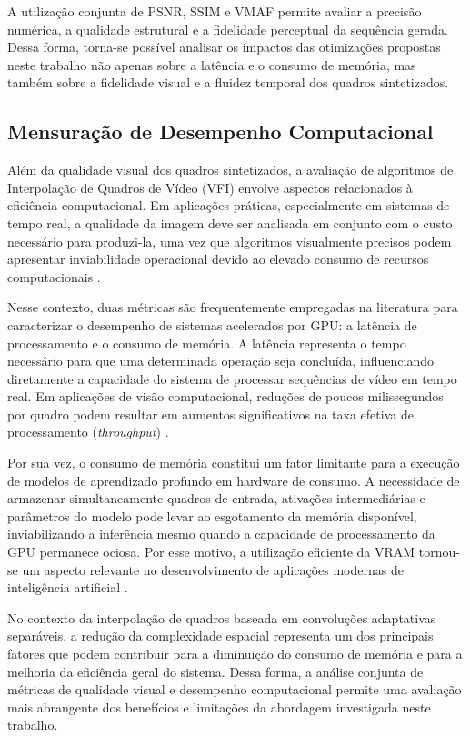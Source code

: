 \documentclass[
    12pt,                %
    openright,           %
    oneside,             %
    a4paper,             %
    english,             %
    brazil               %
]{abntex2}
\begin{document}
\vspace{0.3cm}

A utilização conjunta de PSNR, SSIM e VMAF permite avaliar a precisão numérica, a qualidade estrutural e a fidelidade perceptual da sequência gerada. Dessa forma, torna-se possível analisar os impactos das otimizações propostas neste trabalho não apenas sobre a latência e o consumo de memória, mas também sobre a fidelidade visual e a fluidez temporal dos quadros sintetizados.

\subsection{Mensuração de Desempenho Computacional}

Além da qualidade visual dos quadros sintetizados, a avaliação de algoritmos de Interpolação de Quadros de Vídeo (VFI) envolve aspectos relacionados à eficiência computacional. Em aplicações práticas, especialmente em sistemas de tempo real, a qualidade da imagem deve ser analisada em conjunto com o custo necessário para produzi-la, uma vez que algoritmos visualmente precisos podem apresentar inviabilidade operacional devido ao elevado consumo de recursos computacionais \cite{Kirk2023}.

Nesse contexto, duas métricas são frequentemente empregadas na literatura para caracterizar o desempenho de sistemas acelerados por GPU: a latência de processamento e o consumo de memória. A latência representa o tempo necessário para que uma determinada operação seja concluída, influenciando diretamente a capacidade do sistema de processar sequências de vídeo em tempo real. Em aplicações de visão computacional, reduções de poucos milissegundos por quadro podem resultar em aumentos significativos na taxa efetiva de processamento (\textit{throughput}) \cite{Hennessy2022}.

Por sua vez, o consumo de memória constitui um fator limitante para a execução de modelos de aprendizado profundo em hardware de consumo. A necessidade de armazenar simultaneamente quadros de entrada, ativações intermediárias e parâmetros do modelo pode levar ao esgotamento da memória disponível, inviabilizando a inferência mesmo quando a capacidade de processamento da GPU permanece ociosa. Por esse motivo, a utilização eficiente da VRAM tornou-se um aspecto relevante no desenvolvimento de aplicações modernas de inteligência artificial \cite{NvidiaCUDA2025}.

No contexto da interpolação de quadros baseada em convoluções adaptativas separáveis, a redução da complexidade espacial representa um dos principais fatores que podem contribuir para a diminuição do consumo de memória e para a melhoria da eficiência geral do sistema. Dessa forma, a análise conjunta de métricas de qualidade visual e desempenho computacional permite uma avaliação mais abrangente dos benefícios e limitações da abordagem investigada neste trabalho.
\end{document}
